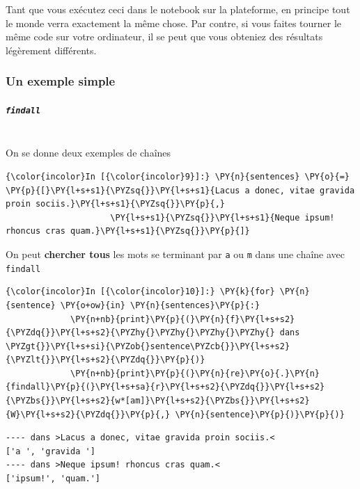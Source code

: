 Tant que vous exécutez ceci dans le notebook sur la plateforme, en
principe tout le monde verra exactement la même chose. Par contre, si
vous faites tourner le même code sur votre ordinateur, il se peut que
vous obteniez des résultats légèrement différents.

    \hypertarget{un-exemple-simple}{%
\subsubsection{Un exemple simple}\label{un-exemple-simple}}

    \hypertarget{findall}{%
\subparagraph{\texorpdfstring{\texttt{findall}}{findall}\\\\}\label{findall}}

    On se donne deux exemples de chaînes

    \begin{Verbatim}[commandchars=\\\{\}]
{\color{incolor}In [{\color{incolor}9}]:} \PY{n}{sentences} \PY{o}{=} \PY{p}{[}\PY{l+s+s1}{\PYZsq{}}\PY{l+s+s1}{Lacus a donec, vitae gravida proin sociis.}\PY{l+s+s1}{\PYZsq{}}\PY{p}{,} 
                     \PY{l+s+s1}{\PYZsq{}}\PY{l+s+s1}{Neque ipsum! rhoncus cras quam.}\PY{l+s+s1}{\PYZsq{}}\PY{p}{]}
\end{Verbatim}


    On peut \textbf{chercher tous} les mots se terminant par \texttt{a} ou
\texttt{m} dans une chaîne avec \texttt{findall}

    \begin{Verbatim}[commandchars=\\\{\}]
{\color{incolor}In [{\color{incolor}10}]:} \PY{k}{for} \PY{n}{sentence} \PY{o+ow}{in} \PY{n}{sentences}\PY{p}{:}
             \PY{n+nb}{print}\PY{p}{(}\PY{n}{f}\PY{l+s+s2}{\PYZdq{}}\PY{l+s+s2}{\PYZhy{}\PYZhy{}\PYZhy{}\PYZhy{} dans \PYZgt{}}\PY{l+s+si}{\PYZob{}sentence\PYZcb{}}\PY{l+s+s2}{\PYZlt{}}\PY{l+s+s2}{\PYZdq{}}\PY{p}{)}
             \PY{n+nb}{print}\PY{p}{(}\PY{n}{re}\PY{o}{.}\PY{n}{findall}\PY{p}{(}\PY{l+s+sa}{r}\PY{l+s+s2}{\PYZdq{}}\PY{l+s+s2}{\PYZbs{}}\PY{l+s+s2}{w*[am]}\PY{l+s+s2}{\PYZbs{}}\PY{l+s+s2}{W}\PY{l+s+s2}{\PYZdq{}}\PY{p}{,} \PY{n}{sentence}\PY{p}{)}\PY{p}{)}
\end{Verbatim}


    \begin{Verbatim}[commandchars=\\\{\}]
---- dans >Lacus a donec, vitae gravida proin sociis.<
['a ', 'gravida ']
---- dans >Neque ipsum! rhoncus cras quam.<
['ipsum!', 'quam.']

    \end{Verbatim}

